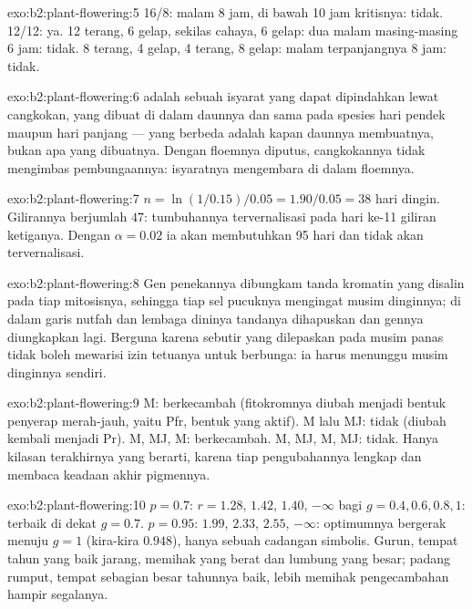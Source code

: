 \begin{solution}{exo:b2:plant-flowering:5}
16/8: malam 8 jam, di bawah 10 jam kritisnya: tidak. 12/12: ya.
12 terang, 6 gelap, sekilas cahaya, 6 gelap: dua malam masing-masing 6
jam: tidak. 8 terang, 4 gelap, 4 terang, 8 gelap: malam terpanjangnya 8
jam: tidak.
\end{solution}

\begin{solution}{exo:b2:plant-flowering:6}
 adalah sebuah isyarat yang dapat dipindahkan lewat cangkokan,
yang dibuat di dalam daunnya dan sama pada spesies hari pendek maupun
hari panjang --- yang berbeda adalah kapan daunnya membuatnya, bukan
apa yang dibuatnya. Dengan floemnya diputus, cangkokannya tidak
mengimbas pembungaannya: isyaratnya mengembara di dalam floemnya.
\end{solution}

\begin{solution}{exo:b2:plant-flowering:7}
$n = \ln(1/0.15)/0.05 = 1.90/0.05 = 38$ hari dingin. Gilirannya
berjumlah $47$: tumbuhannya tervernalisasi pada hari ke-11 giliran
ketiganya. Dengan $\alpha = 0.02$ ia akan membutuhkan 95 hari dan tidak
akan tervernalisasi.
\end{solution}

\begin{solution}{exo:b2:plant-flowering:8}
Gen penekannya dibungkam tanda kromatin yang disalin pada tiap
mitosisnya, sehingga tiap sel pucuknya mengingat musim dinginnya; di
dalam garis nutfah dan lembaga dininya tandanya dihapuskan dan gennya
diungkapkan lagi. Berguna karena sebutir  yang dilepaskan pada
musim panas tidak boleh mewarisi izin tetuanya untuk berbunga: ia harus
menunggu musim dinginnya sendiri.
\end{solution}

\begin{solution}{exo:b2:plant-flowering:9}
M: berkecambah (fitokromnya diubah menjadi bentuk penyerap merah-jauh,
yaitu Pfr, bentuk yang aktif). M lalu MJ: tidak (diubah kembali menjadi
Pr). M, MJ, M: berkecambah. M, MJ, M, MJ: tidak. Hanya kilasan
terakhirnya yang berarti, karena tiap pengubahannya lengkap dan 
membaca keadaan akhir pigmennya.
\end{solution}

\begin{solution}{exo:b2:plant-flowering:10}
$p = 0.7$: $r = 1.28$, $1.42$, $1.40$, $-\infty$ bagi $g = 0.4, 0.6, 0.8,
1$: terbaik di dekat $g = 0.7$. $p = 0.95$: $1.99$, $2.33$, $2.55$,
$-\infty$: optimumnya bergerak menuju $g = 1$ (kira-kira $0.948$),
hanya sebuah cadangan simbolis. Gurun, tempat tahun yang baik jarang,
memihak  yang berat dan lumbung  yang besar; padang rumput,
tempat sebagian besar tahunnya baik, lebih memihak pengecambahan
hampir segalanya.
\end{solution}

